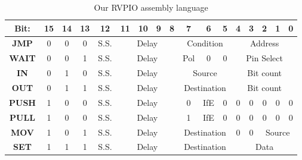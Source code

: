 \begin{table}[h!]
    \begin{tabular}{|c|c|c|c|c|c|c|c|c|c|c|c|c|c|c|c|c|}
        \hline
        \textbf{Bit:} & 15 & 14 & 13 & 12   & 11                         & 10                               & 9                              & 8 & 7                               & 6 & 5 & 4 & 3 & 2 & 1 & 0 \\ \hline
        \textbf{JMP}  & 0  & 0  & 0  & S.S. & \multicolumn{4}{c|}{Delay} & \multicolumn{3}{c|}{Condition}   & \multicolumn{5}{c|}{Address}                                                                     \\ \hline
        \textbf{WAIT} & 0  & 0  & 1  & S.S. & \multicolumn{4}{c|}{Delay} & Pol                              & 0                              & 0 & \multicolumn{5}{c|}{Pin Select}                             \\ \hline
        \textbf{IN}   & 0  & 1  & 0  & S.S. & \multicolumn{4}{c|}{Delay} & \multicolumn{3}{c|}{Source}      & \multicolumn{5}{c|}{Bit count}                                                                   \\ \hline
        \textbf{OUT}  & 0  & 1  & 1  & S.S. & \multicolumn{4}{c|}{Delay} & \multicolumn{3}{c|}{Destination} & \multicolumn{5}{c|}{Bit count}                                                                   \\ \hline
        \textbf{PUSH} & 1  & 0  & 0  & S.S. & \multicolumn{4}{c|}{Delay} & 0                                & IfE                            & 0 & 0                               & 0 & 0 & 0 & 0             \\ \hline
        \textbf{PULL} & 1  & 0  & 0  & S.S. & \multicolumn{4}{c|}{Delay} & 1                                & IfE                            & 0 & 0                               & 0 & 0 & 0 & 0             \\ \hline
        \textbf{MOV}  & 1  & 0  & 1  & S.S. & \multicolumn{4}{c|}{Delay} & \multicolumn{3}{c|}{Destination} & 0                              & 0 & \multicolumn{3}{c|}{Source}                                 \\ \hline
        \textbf{SET}  & 1  & 1  & 1  & S.S. & \multicolumn{4}{c|}{Delay} & \multicolumn{3}{c|}{Destination} & \multicolumn{5}{c|}{Data}                                                                        \\ \hline
    \end{tabular}
    \caption{Our RVPIO assembly language \cite{rp2040}}
    \label{tab:rvpioasm}
\end{table}

